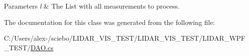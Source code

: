 \begin{DoxyParams}{Parameters}
{\em l} & The List with all measurements to process. \\
\hline
\end{DoxyParams}


The documentation for this class was generated from the following file\+:\begin{DoxyCompactItemize}
\item 
C\+:/\+Users/alex-\//sciebo/\+L\+I\+D\+A\+R\+\_\+\+V\+I\+S\+\_\+\+T\+E\+S\+T/\+L\+I\+D\+A\+R\+\_\+\+V\+I\+S\+\_\+\+T\+E\+S\+T/\+L\+I\+D\+A\+R\+\_\+\+W\+P\+F\+\_\+\+T\+E\+S\+T/\hyperlink{_d_a_o_8cs}{D\+A\+O.\+cs}\end{DoxyCompactItemize}
